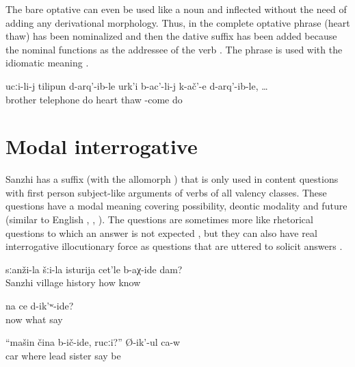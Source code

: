The bare optative can even be used like a noun and inflected without the need of adding any derivational morphology. Thus, in  the complete optative phrase  (heart thaw)  has been nominalized and then the dative suffix has been added because the nominal functions as the addressee of the verb . The phrase is used with the idiomatic meaning .
%
\begin{exe}
	\ex	\label{ex:When they called the brother}
	\gll	ucːi-li-j	tilipun	d-arq'-ib-le	urk'i	b-ac'-li-j	k-ač'-e	d-arq'-ib-le,	\ldots\\
		brother	telephone	do	heart	thaw		-come	do\\
	\glt	{}
\end{exe}



\section{Modal interrogative}
\label{sec:modalinterrogative}

Sanzhi has a suffix  (with the allomorph ) that is only used in content questions with first person subject-like arguments of verbs of all valency classes. These questions have a modal meaning covering possibility, deontic modality and future (similar to English , , ). The questions are sometimes more like rhetorical questions to which an answer is not expected , but they can also have real interrogative illocutionary force as questions that are uttered to solicit answers . 
%
\begin{exe}
	\ex	\label{ex:‎How can I know about the history of Sanzhi}
	\gll	sːanži-la	šːi-la	isturija	cet'le	b-aχ-ide	dam?\\
		Sanzhi	village	history	how	know 	\\
	\glt	{}

	\ex	\label{ex:‎‎Now what can we say}
	\gll	na	ce	d-ik'ʷ-ide?\\
		now	what	say\\
	\glt	{}

	\ex	\label{ex:‎Where should I bring the car, sister}
	\gll	``mašin	čina	b-ič-ide,	rucːi?''		Ø-ik'-ul	ca-w\\
		car	where		lead		sister		say	be\\
	\glt	{}
\end{exe}

